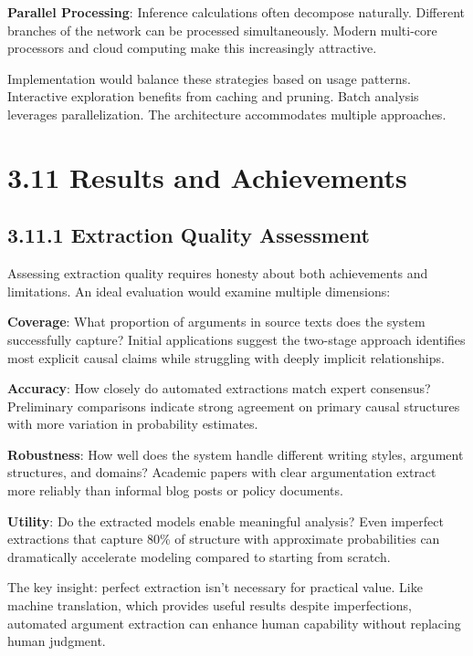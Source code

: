 \documentclass[
  11pt,
  letterpaper,
]{book}
\begin{document}
\textbf{Parallel Processing}: Inference calculations often decompose
naturally. Different branches of the network can be processed
simultaneously. Modern multi-core processors and cloud computing make
this increasingly attractive.

Implementation would balance these strategies based on usage patterns.
Interactive exploration benefits from caching and pruning. Batch
analysis leverages parallelization. The architecture accommodates
multiple approaches.

\section{3.11 Results and Achievements}\label{sec-results-achievements}

\subsection{3.11.1 Extraction Quality
Assessment}\label{sec-extraction-quality}

Assessing extraction quality requires honesty about both achievements
and limitations. An ideal evaluation would examine multiple dimensions:

\textbf{Coverage}: What proportion of arguments in source texts does the
system successfully capture? Initial applications suggest the two-stage
approach identifies most explicit causal claims while struggling with
deeply implicit relationships.

\textbf{Accuracy}: How closely do automated extractions match expert
consensus? Preliminary comparisons indicate strong agreement on primary
causal structures with more variation in probability estimates.

\textbf{Robustness}: How well does the system handle different writing
styles, argument structures, and domains? Academic papers with clear
argumentation extract more reliably than informal blog posts or policy
documents.

\textbf{Utility}: Do the extracted models enable meaningful analysis?
Even imperfect extractions that capture 80\% of structure with
approximate probabilities can dramatically accelerate modeling compared
to starting from scratch.

The key insight: perfect extraction isn't necessary for practical value.
Like machine translation, which provides useful results despite
imperfections, automated argument extraction can enhance human
capability without replacing human judgment.
\end{document}
